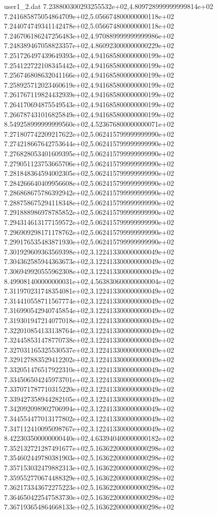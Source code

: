 \begin{filecontents}{user1_2.dat}
7.238800300293255532e+02,4.809728999999999814e+02
7.241685875054864709e+02,5.056674800000000118e+02
7.244074749341142478e+02,5.056674800000000118e+02
7.246706186247256483e+02,4.970889999999999986e+02
7.248389467058823357e+02,4.860923000000000229e+02
7.251726497439649393e+02,4.941685800000000199e+02
7.254122722108345442e+02,4.941685800000000199e+02
7.256746808632041166e+02,4.941685800000000199e+02
7.258925712023460619e+02,4.941685800000000199e+02
7.261767119824432939e+02,4.941685800000000199e+02
7.264170694875549543e+02,4.941685800000000199e+02
7.266787431016825849e+02,4.941685800000000199e+02
8.549258999999999560e+02,4.523676800000000071e+02
7.271807742209217622e+02,5.062415799999999990e+02
7.274218667642753644e+02,5.062415799999999990e+02
7.276828053401609395e+02,5.062415799999999990e+02
7.279051123753665706e+02,5.062415799999999990e+02
7.281848364594002305e+02,5.062415799999999990e+02
7.284266640409956608e+02,5.062415799999999990e+02
7.286868675786392942e+02,5.062415799999999990e+02
7.288758675294118348e+02,5.062415799999999990e+02
7.291888986978785852e+02,5.062415799999999990e+02
7.294314613177159572e+02,5.062415799999999990e+02
7.296909298171178762e+02,5.062415799999999990e+02
7.299176535483871930e+02,5.062415799999999990e+02
7.301929609363569398e+02,3.122413300000000049e+02
7.304362585944363673e+02,3.122413300000000049e+02
7.306949920555962308e+02,3.122413300000000049e+02
8.499081400000000031e+02,4.563830600000000004e+02
7.311970231748354081e+02,3.122413300000000049e+02
7.314410558711567774e+02,3.122413300000000049e+02
7.316990542940745854e+02,3.122413300000000049e+02
7.319301947214077018e+02,3.122413300000000049e+02
7.322010854133138764e+02,3.122413300000000049e+02
7.324458531478770738e+02,3.122413300000000049e+02
7.327031165325530537e+02,3.122413300000000049e+02
7.329127883529412202e+02,3.122413300000000049e+02
7.332051476517922310e+02,3.122413300000000049e+02
7.334506504245973701e+02,3.122413300000000049e+02
7.337071787710315220e+02,3.122413300000000049e+02
7.339427358944282105e+02,3.122413300000000049e+02
7.342092098902706994e+02,3.122413300000000049e+02
7.344554477013177802e+02,3.122413300000000049e+02
7.347112410095098767e+02,3.122413300000000049e+02
8.422303500000000440e+02,4.633940400000000182e+02
7.352132721287491677e+02,5.163622000000000298e+02
7.354602449780381903e+02,5.163622000000000298e+02
7.357153032479882313e+02,5.163622000000000298e+02
7.359552770674488329e+02,5.163622000000000298e+02
7.362173343672275223e+02,5.163622000000000298e+02
7.364650422547583730e+02,5.163622000000000298e+02
7.367193654864668133e+02,5.163622000000000298e+02

\end{filecontents}
